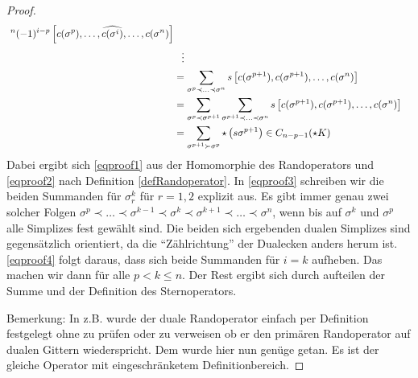 \begin{proof}
\begin{align}
{\begin{smallmatrix}
                                                \end{smallmatrix}}^{n} (-1)^{i-p} \left[ c(\sigma^{p}),\ldots, \widehat{c(\sigma^{i})},\ldots, c(\sigma^{n})\right] \label{eqproof4}\\
                              &\hphantom{=}\vdots\notag\\
                              &= \sum_{\sigma^{p}\prec\ldots\prec\sigma^{n}} s \left[ c(\sigma^{p+1}), c(\sigma^{p+1}),\ldots, c(\sigma^{n})\right]  \label{eqproof5}\\
                              &= \sum_{\sigma^{p}\prec\sigma^{p+1}}
                                          \sum_{\sigma^{p+1}\prec\ldots\prec\sigma^{n}} s \left[ c(\sigma^{p+1}), c(\sigma^{p+1}),\ldots, c(\sigma^{n})\right]  \label{eqproof5}\\
                              &= \sum_{\sigma^{p+1} \succ \sigma^{p}} \star \left( s \sigma^{p+1} \right) \in C_{n-p-1}(\star K)
    \end{align}
    Dabei ergibt sich \eqref{eqproof1} aus der Homomorphie des Randoperators und \eqref{eqproof2} nach Definition \ref{defRandoperator}.
    In \eqref{eqproof3} schreiben wir die beiden Summanden für \( \sigma^{k}_{r} \) für \( r = 1,2 \) explizit aus. 
    Es gibt immer genau zwei solcher Folgen \( \sigma^{p}\prec\ldots\prec\sigma^{k-1}\prec\sigma^{k}\prec\sigma^{k+1}\prec\ldots\prec\sigma^{n} \),
    wenn bis auf \( \sigma^{k} \) und \( \sigma^{p} \) alle Simplizes fest gewählt sind. 
    Die beiden sich ergebenden dualen Simplizes sind gegensätzlich orientiert, da die "`Zählrichtung"' der Dualecken anders herum ist.
    \eqref{eqproof4} folgt daraus, dass sich beide Summanden für \( i=k \) aufheben. 
    Das machen wir dann für alle \( p < k \le n \).
    Der Rest ergibt sich durch aufteilen der Summe und der Definition des Sternoperators.

    Bemerkung:
    In z.B. \cite{hirani} wurde der duale Randoperator einfach per Definition festgelegt ohne zu prüfen oder zu verweisen ob er den primären Randoperator auf dualen Gittern wiederspricht.
    Dem wurde hier nun genüge getan. Es ist der gleiche Operator mit eingeschränketem Definitionbereich.
  \end{proof}

